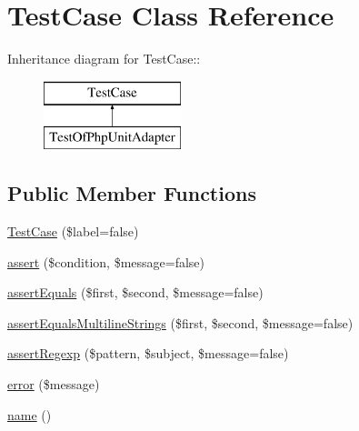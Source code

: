 \hypertarget{class_test_case}{
\section{TestCase Class Reference}
\label{class_test_case}
}
Inheritance diagram for TestCase::\begin{figure}[H]
\begin{center}
\leavevmode
\includegraphics[height=2cm]{class_test_case}
\end{center}
\end{figure}
\subsection*{Public Member Functions}
\begin{DoxyCompactItemize}
\item 
\hyperlink{class_test_case_aa9f6e3096465c14ae196869c4062dcbf}{TestCase} (\$label=false)
\item 
\hyperlink{class_test_case_a5833f594930beb55e38d29331dc3908f}{assert} (\$condition, \$message=false)
\item 
\hyperlink{class_test_case_a6315b8392b57be03f75453c3dd63e04a}{assertEquals} (\$first, \$second, \$message=false)
\item 
\hyperlink{class_test_case_a1069303e24b7cef670a045e017c7465c}{assertEqualsMultilineStrings} (\$first, \$second, \$message=false)
\item 
\hyperlink{class_test_case_a342e763f086479a4dfd80d719145dffd}{assertRegexp} (\$pattern, \$subject, \$message=false)
\item 
\hyperlink{class_test_case_ac90136f48031a65db56fce777773129c}{error} (\$message)
\item 
\hyperlink{class_test_case_a0e29a22bb0eb113598d328e2acf64c62}{name} ()
\end{DoxyCompactItemize}


